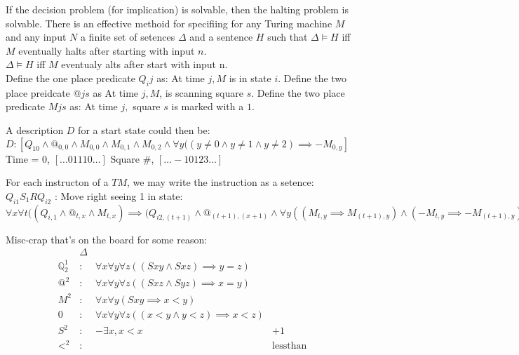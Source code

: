 \begin{lemma}[Undecibality]
If the decision problem (for implication) is solvable, then the halting problem is solvable.
There is an effective methoid for specifiing for any Turing machine $M$ and any input $N$ a finite set of setences $\Delta$ and a sentence $H$ such that $\Delta \vDash H$ iff $M$ eventually halts after starting with input $n$. \\
$\Delta \vDash H$ iff $M$ eventualy alts after start with input n.\\


Define the one place predicate $Q_ij$ as: At time $j, M$ is in state $i$.
Define the two place preidcate $@js$ as At time $j, M$, is scanning square $s$.
Define the two place predicate $Mjs$ as: At time $j,$ square $s$ is marked with a $1$.

A description $D$ for a start state could then be:
$D: [Q_10 \wedge @_{0,0} \wedge M_{0,0} \wedge M_{0,1} \wedge M_{0,2} \wedge \forall y((y \not = 0 \wedge y \not = 1 \wedge y \not = 2 ) \implies - M_{0,y}]$
Time = 0, $[ \dots 0 1 1 1 0 \dots ]$
Square \#, $[\dots -1 0 1 2 3 \dots ]$

\end{lemma}

For each instructon of a $TM$, we may write the instruction as a setence: \\
$Q_{i1}S_1RQ_{i2}$ : 
Move right seeing 1 in state: \\
$\forall x \forall t ((Q_{i,1} \wedge @_{t,x} \wedge M_{t,x}) \implies (Q_{i2,(t+1)} \wedge @_{(t+1),(x+1)} \wedge \forall y((M_{t,y} \implies M_{(t+1),y}) \wedge (- M_{t,y} \implies - M_{(t+1),y}))$


Misc-crap that's on the board for some reason: \\
\begin{align*}
 & \Delta \\
\mathbb{Q}^1_2  &:& \forall x \forall y \forall z ((Sxy \wedge Sxz) \implies y = z)       & \text{}\\
@^2            &:& \forall x \forall y \forall z ((Sxz \wedge Syz) \implies x = y )       & \text{}\\
M^2             &:& \forall x \forall y ( Sxy \implies x < y )                            & \text{}\\
0               &:& \forall x \forall y \forall z ((x < y \wedge y < z ) \implies x < z ) & \text{}\\
S^2             &:& - \exists x , x < x                                                   & \text{+1}\\
<^2             &:& & \text{lessthan}
\end{align*}

